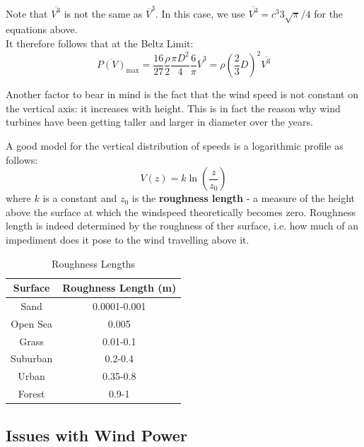 Note that $\overline{V^3}$ is not the same as $\overline{V}^3$. In this case, we
use $\overline{V^3} = c^3 3\sqrt{\pi}/4$ for the equations above.\\

It therefore follows that at the Beltz Limit:
$$
\boxed{
\overline{P(V)}_{\text{max}} = \frac{16}{27} \frac{\rho}{2} \frac{\pi D^2}{4}
\frac{6}{\pi} \overline{V}^3 = \rho \left( \frac{2}{3} D \right)^2 \overline{V^3}}
$$

Another factor to bear in mind is the fact that the wind speed is not constant
on the vertical axis: it increases with height. This is in fact the reason why
wind turbines have been getting taller and larger in diameter over the years.

A good model for the vertical distribution of speeds is a logarithmic profile 
as follows:
$$
\boxed{V(z) = k \ln \left(\frac{z}{z_0}\right)}
$$
where $k$ is a constant and $z_0$ is the \textbf{roughness length} - a measure
of the height above the surface at which the windspeed theoretically becomes zero.
Roughness length is indeed determined by the roughness of ther surface, i.e. how
much of an impediment does it pose to the wind travelling above it.

\begin{table}[h]
    \centering
    \begin{tabular}{c|c}
        \textbf{Surface} & \textbf{Roughness Length (m)}\\
        \hline
        Sand & 0.0001-0.001\\
        Open Sea & 0.005\\
        Grass & 0.01-0.1\\
        Suburban & 0.2-0.4\\
        Urban & 0.35-0.8\\
        Forest & 0.9-1\\
    \end{tabular}
    \caption{Roughness Lengths}
    \label{tab:roughness_lengths}
\end{table}

\subsection{Issues with Wind Power}
\label{sec:issues_with_wind_power}

